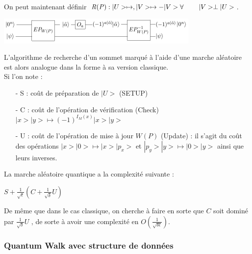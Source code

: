 \documentclass[12pt,openany]{report}
\begin{document}
On peut maintenant définir  $ \mathit{R}(\mathit{P}):|U> \mapsto , |V> \mapsto -|V> \forall \hspace{0.8cm} |V> \perp |U>$.
\begin{center}
\includegraphics[scale=1.5]{./oracle}
\end{center}
L’algorithme de recherche d’un sommet marqué à l’aide d’une marche aléatoire
est alors analogue dans la forme à sa version classique.\\
Si l’on note :
\begin{itemize}
\item[- S :] coût de préparation de $ |U> $ (SETUP)
\item[- C :] coût de l’opération de vérification (Check)  $      |x> |y> \mapsto (-1)^{I_M(x)}|x>|y>$
 \item[- U :] coût de l’opération de mise à jour $W(P)$ (Update) : il s’agit du coût des
opérations $|x>|0>  \mapsto |x>|p_x> $ et $ |p_y>|y> \mapsto |0>|y> $ ainsi que leurs inverses.
\end{itemize}
La marche aléatoire quantique a la complexité suivante :


\begin{center}
\begin{boxedminipage}[ poslb ]{4cm}
\begin{center}
{\Large
$\mathit{S} + \frac{1}{\sqrt{\epsilon}}(C + \frac{1}{\sqrt{\delta}}U)$
}
\end{center}
\end{boxedminipage}
\end{center}
De même que dans le cas classique, on cherche à faire en sorte que $\mathit{C}$ soit dominé
par $ \frac{1}{\sqrt{\delta}}U $ , de sorte à avoir une complexité en $ O(\frac{1}{\sqrt{\delta \epsilon}}) $.

\subsubsection{Quantum Walk avec structure de données}
\end{document}
